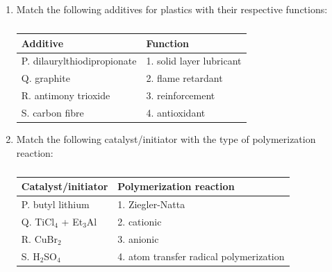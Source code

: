 \documentclass[a4paper,10pt]{article}
\begin{document}
\begin{enumerate}[label=\Alph*)]
    \item Match the following additives for plastics with their respective functions:
    \begin{table}[h!] \centering \caption*{} \label{tab:q18_polymer}
        \begin{tabular}{ll} \hline
            \textbf{Additive} & \textbf{Function} \\ \hline
            P. dilaurylthiodipropionate & 1. solid layer lubricant \\
            Q. graphite & 2. flame retardant \\
            R. antimony trioxide & 3. reinforcement \\
            S. carbon fibre & 4. antioxidant \\ \hline
        \end{tabular}
    \end{table}
    
    \hfill{}
    \begin{enumerate}[label=\Alph*)]
    \end{enumerate}
    
    \item Match the following catalyst/initiator with the type of polymerization reaction:
    \begin{table}[h!] \centering \caption*{} \label{tab:q19_polymer}
        \begin{tabular}{ll} \hline
            \textbf{Catalyst/initiator} & \textbf{Polymerization reaction} \\ \hline
            P. butyl lithium & 1. Ziegler-Natta \\
            Q. TiCl$_4$ + Et$_3$Al & 2. cationic \\
            R. CuBr$_2$ & 3. anionic \\
            S. H$_2$SO$_4$ & 4. atom transfer radical polymerization \\ \hline
        \end{tabular}
    \end{table}
    

\end{enumerate}
\end{document}

